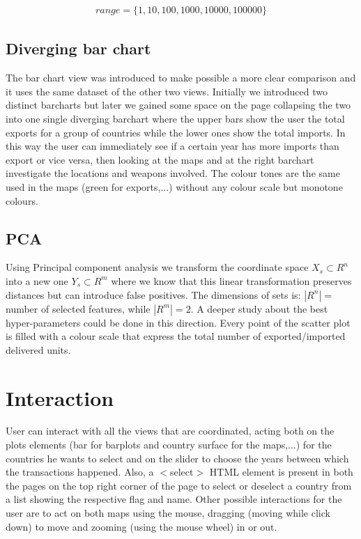 \documentclass{article}
\begin{document}
\begin{multicols}{2}
\begin{align}
	range=\{1,10,100,1000,10000,100000\}
\end{align}

\subsection{Diverging bar chart}

The bar chart view was introduced to make possible a more clear comparison and it uses the same dataset of the other two views. Initially we introduced two distinct barcharts but later we gained some space on the page collapsing the two into one single diverging barchart where the upper bars show the user the total exports for a group of countries while the lower ones show the total imports. In this way the user can immediately see if a certain year has more imports than export or vice versa, then looking at the maps and at the right barchart investigate the locations and weapons involved. The colour tones are the same used in the maps (green for exports,...) without any colour scale but monotone colours.  

\subsection{PCA}
Using Principal component analysis we transform the coordinate space $X_s \subset R^n$ into a new one $Y_s \subset R^m$ where we know that this linear transformation preserves distances but can introduce false positives. The dimensions of sets is: $|R^n|=$ number of selected features, while $|R^m|=2$.
A deeper study about the best hyper-parameters could be done in this direction. 
Every point of the scatter plot is filled with a colour scale that express the total number of exported/imported delivered units.

\section{Interaction}
User can interact with all the views 
that are coordinated, acting both on the plots elements (bar for barplots and country surface for the maps,...) for the countries he wants to select and on the slider to choose the years between which the transactions happened.
Also, a $<$select$>$ HTML element is present in both the pages on the top right corner of the page to select or deselect a country from a list showing the respective flag and name. Other possible interactions for the user are to act on both maps using the mouse, dragging (moving while click down) to move and zooming (using the mouse wheel) in or out. 


\end{multicols}
\end{document}
